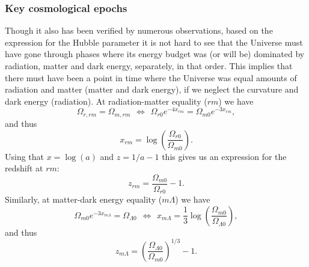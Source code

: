 \documentclass{aa}
\numberwithin{equation}{section}
\numberwithin{table}{section}
\numberwithin{figure}{section}
\begin{document}
\subsubsection{Key cosmological epochs}
Though it also has been verified by numerous observations, based on the expression for the Hubble parameter it is not hard to see that the Universe must have gone through phases where its energy budget was (or will be) dominated by radiation, matter and dark energy, separately, in that order. This implies that there must have been a point in time where the Universe was equal amounts of radiation and matter (matter and dark energy), if we neglect the curvature and dark energy (radiation). At radiation-matter equality ($rm$) we have
\begin{equation}
    \Omega_{r,rm} = \Omega_{m,rm} 
    \hspace{5pt}\Leftrightarrow\hspace{5pt} 
    \Omega_{r0}e^{-4x_{rm}} = \Omega_{m0}e^{-3x_{rm}}, 
\end{equation}
and thus
\begin{equation}
  x_{rm} = \log\left(\frac{\Omega_{r0}}{\Omega_{m0}}\right).
\end{equation}
Using that $x = \log (a)$ and $z = 1/a - 1$ this gives us an expression for the redshift at $rm$:
\begin{equation}
  z_{rm} = \frac{\Omega_{m0}}{\Omega_{r0}} - 1.
\end{equation} 
Similarly, at matter-dark energy equality ($m\Lambda$) we have
\begin{equation}
  \Omega_{m0}e^{-3x_{m\Lambda}} = \Omega_{\Lambda0}
  \hspace{5pt}\Leftrightarrow\hspace{5pt}
  x_{m\Lambda} = \frac{1}{3}\log\left(\frac{\Omega_{m0}}{\Omega_{\Lambda0}}\right),
\end{equation}
and thus
\begin{equation}
  z_{m\Lambda} = \left(\frac{\Omega_{\Lambda0}}{\Omega_{m0}}\right)^{1/3} - 1.
\end{equation}
\end{document}

